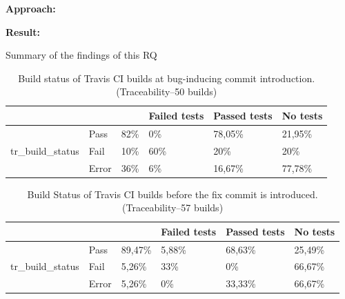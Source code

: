 \documentclass[10pt,conference]{IEEEtran}
\newcommand{\conclusion}[1]{\begin{center}\begin{tcolorbox}[skin=widget, left=0.5mm,right=0.5mm,top=0.5mm,bottom=0.5mm,boxrule=0.3mm,arc=0mm,coltitle=black,colframe=black!99!white,colback=white!88!gray,width=(\linewidth),before=\hfill,after=\hfill]#1\end{tcolorbox}\end{center}}
\begin{document}
\noindent\textbf{Approach:}


\noindent\textbf{Result:}

\conclusion{Summary of the findings of this RQ}

\begin{table}[t]
\centering
\begin{tabular}{lll|lll}
\hline
\multicolumn{3}{l|}{}                                      & Failed tests & Passed tests & No tests \\ \hline
\multirow{3}{*}{tr\_build\_status} & Pass  & 82\% & 0\%          & 78,05\%      & 21,95\%  \\
                                            & Fail  & 10\% & 60\%         & 20\%         & 20\%     \\
                                            & Error & 36\% & 6\%          & 16,67\%      & 77,78\%  \\ \hline
\end{tabular}
\label{tab:bugintro}
\caption{Build status of Travis CI builds at bug-inducing commit introduction. \\ (Traceability--50 builds)}
\end{table}

\begin{table}[t]
\centering
\begin{tabular}{lll|lll}
\hline
\multicolumn{3}{l|}{}                                & Failed tests & Passed tests & No tests \\ \hline
\multirow{3}{*}{tr\_build\_status} & Pass  & 89,47\% & 5,88\%       & 68,63\%      & 25,49\%  \\
                                   & Fail  & 5,26\%  & 33\%         & 0\%          & 66,67\%  \\
                                   & Error & 5,26\%  & 0\%          & 33,33\%      & 66,67\%  \\ \hline
\end{tabular}
\label{tab:beforefix}
\caption{Build Status of Travis CI builds before the fix commit is introduced. \\ (Traceability--57 builds)}
\end{table}
\end{document}
